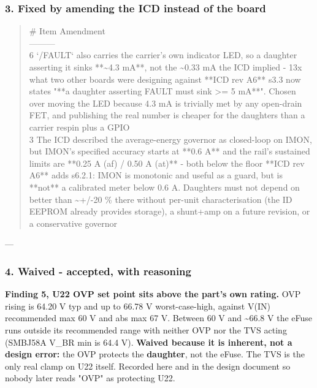 \documentclass[11pt,a4paper]{article}
\begin{document}
\subsubsection*{3. Fixed by amending the ICD instead of the board}
\begin{quote}\small\ttfamily\raggedright
\textbar{} \# \textbar{} Item \textbar{} Amendment \textbar{}\\
\textbar{}---\textbar{}---\textbar{}---\textbar{}\\
\textbar{} 6 \textbar{} `/FAULT` also carries the carrier's own indicator LED, so a daughter asserting it sinks {*}{*}\textasciitilde{}4.3 mA{*}{*}, not the \textasciitilde{}0.33 mA the ICD implied - 13x what two other boards were designing against \textbar{} {*}{*}ICD rev A6{*}{*} s3.3 now states "{*}{*}a daughter asserting FAULT must sink \textgreater{}= 5 mA{*}{*}". Chosen over moving the LED because 4.3 mA is trivially met by any open-drain FET, and publishing the real number is cheaper for the daughters than a carrier respin plus a GPIO \textbar{}\\
\textbar{} 3 \textbar{} The ICD described the average-energy governor as closed-loop on IMON, but IMON's specified accuracy starts at {*}{*}0.6 A{*}{*} and the rail's sustained limits are {*}{*}0.25 A (af) / 0.50 A (at){*}{*} - both below the floor \textbar{} {*}{*}ICD rev A6{*}{*} adds s6.2.1: IMON is monotonic and useful as a guard, but is {*}{*}not{*}{*} a calibrated meter below 0.6 A. Daughters must not depend on better than \textasciitilde{}+/-20 \% there without per-unit characterisation (the ID EEPROM already provides storage), a shunt+amp on a future revision, or a conservative governor \textbar{}
\end{quote}
---

\subsubsection*{4. Waived - accepted, with reasoning}
\textbf{Finding 5, U22 OVP set point sits above the part's own rating.} OVP rising is 64.20 V typ and up to 66.78 V worst-case-high, against V(IN) recommended max 60 V and abs max 67 V. Between 60 V and \textasciitilde{}66.8 V the eFuse runs outside its recommended range with neither OVP nor the TVS acting (SMBJ58A V\_BR min is 64.4 V). \textbf{Waived because it is inherent, not a design error:} the OVP protects the \textbf{daughter}, not the eFuse. The TVS is the only real clamp on U22 itself. Recorded here and in the design document so nobody later reads "OVP" as protecting U22.
\end{document}
